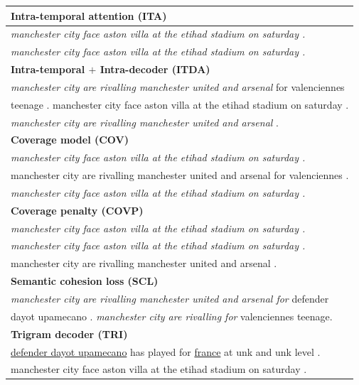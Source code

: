 \begin{table}[th]
\begin{center}
\scriptsize
\begin{tabular}{|l|}%

\hline \bf Intra-temporal attention (ITA) \\
\hline \textit{manchester city face aston villa at the etihad stadium on saturday .} \\
	   \textit{manchester city face aston villa at the etihad stadium on saturday .}\\
\hline \bf Intra-temporal $+$ Intra-decoder (ITDA) \\
\hline \textit{manchester city are rivalling manchester united and arsenal }for valenciennes\\
       teenage . manchester city face aston villa at the etihad stadium on saturday . \\
	   \textit{manchester city are rivalling manchester united and arsenal }. \\
\hline \bf Coverage model (COV) \\
\hline \textit{manchester city face aston villa at the etihad stadium on saturday .} \\
       manchester city are rivalling manchester united and arsenal for valenciennes . \\
	   \textit{manchester city face aston villa at the etihad stadium on saturday .}\\
\hline \bf Coverage penalty (COVP)\\
\hline \textit{manchester city face aston villa at the etihad stadium on saturday .}\\
       \textit{manchester city face aston villa at the etihad stadium on saturday .}\\
	   manchester city are rivalling manchester united and arsenal .\\
\hline \bf Semantic cohesion loss (SCL) \\
\hline \textit{manchester city are rivalling manchester united and arsenal for } defender \\
       dayot upamecano . \textit{manchester city are rivalling for} valenciennes teenage. \\
\hline \bf Trigram decoder (TRI) \\
\hline \underline{defender dayot upamecano} has played for \underline{france} 
at unk and unk level .\\ 
       manchester city face aston villa at the etihad stadium on saturday . \\

\end{tabular}
\end{center}
\end{table}
